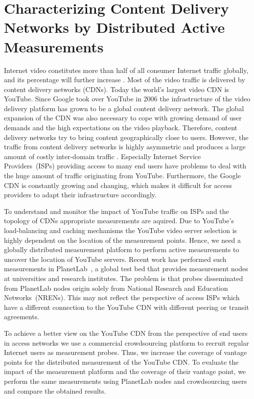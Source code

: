 \section{Characterizing Content Delivery Networks by Distributed Active Measurements}\label{sec:aslevel:crowd}

Internet video constitutes more than half of all consumer Internet traffic globally, and its percentage will further increase \cite{ciscovni2013}. Most of the video traffic is delivered by content delivery networks (CDNs). Today the world's largest video CDN is YouTube. Since Google took over YouTube in 2006 the infrastructure of the video delivery platform has grown to be a global content delivery network.
The global expansion of the CDN was also necessary to cope with growing demand of user demands and the high expectations on the video playback. Therefore, content delivery networks try to bring content geographically close to users.
However, the traffic from content delivery networks is highly asymmetric and produces a large amount of costly inter-domain traffic \cite{labovitz2010internet}. Especially Internet Service Providers~(ISPs) providing access to many end users have problems to deal with the huge amount of traffic originating from YouTube. Furthermore, the Google CDN is constantly growing and changing, which makes it difficult for access providers to adapt their infrastructure accordingly.

To understand and monitor the impact of YouTube traffic on ISPs and the topology of CDNs appropriate measurements are aquired. Due to YouTube's load-balancing and caching mechanisms the YouTube video server selection is highly dependent on the location of the measurement points. Hence, we need a globally distributed measurement platform to perform active measurements to uncover the location of YouTube servers. Recent work \cite{adhikari2012vivisecting,adhikari2011you} has performed such measurements in PlanetLab~\cite{planetlab}, a global test bed that provides measurement nodes at universities and research institutes.
The problem is that probes disseminated from PlanetLab nodes origin solely from National Research and Education Networks~(NRENs). This may not reflect the perspective of access ISPs which have a different connection to the YouTube CDN with different peering or transit agreements.

To achieve a better view on the YouTube CDN from the perspective of end users in access networks we use a commercial crowdsourcing platform to recruit regular Internet users as measurement probes. 
Thus, we increase the coverage of vantage points for the distributed measurement of the YouTube CDN. 
To evaluate the impact of the measurement platform and the coverage of their vantage point,  we perform the same measurements using PlanetLab nodes and crowdsourcing users and compare the obtained results. 

